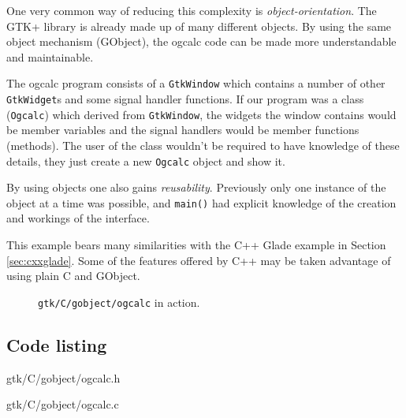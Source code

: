 \documentclass[a4paper,oneside]{article}
\newcommand{\filename}[1]{\texttt{#1}}
\newcommand{\program}[1]{\texttt{#1}}
\newcommand{\class}[1]{\texttt{#1}}
\newcommand{\function}[1]{\texttt{#1()}}
\begin{document}
One very common way of reducing this complexity is
\emph{object-orientation}.  The GTK+ library is already made up of
many different objects.  By using the same object mechanism (GObject),
the ogcalc code can be made more understandable and maintainable.

The ogcalc program consists of a \class{GtkWindow} which contains a
number of other \class{GtkWidget}s and some signal handler functions.
If our program was a class (\class{Ogcalc}) which derived from
\class{GtkWindow}, the widgets the window contains would be member
variables and the signal handlers would be member functions (methods).
The user of the class wouldn't be required to have knowledge of these
details, they just create a new \class{Ogcalc} object and show it.

By using objects one also gains \emph{reusability}.  Previously only
one instance of the object at a time was possible, and \function{main}
had explicit knowledge of the creation and workings of the interface.

This example bears many similarities with the C++ Glade example in
Section \ref{sec:cxxglade}.  Some of the features offered by C++ may
be taken advantage of using plain C and GObject.

\begin{figure}
  \centering
  \caption[\program{gtk/C/gobject/ogcalc} in action]{\program{gtk/C/gobject/ogcalc} in
    action.}
  \label{fig:ogcalcgo}
\end{figure}

\subsection{Code listing}


                 {gtk/C/gobject/ogcalc.h}


                 {gtk/C/gobject/ogcalc.c}
\end{document}
